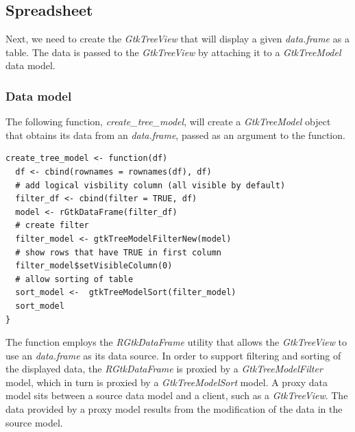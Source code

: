 \documentclass[article]{jss}
\begin{document}
\subsection{Spreadsheet}

Next, we need to create the \emph{GtkTreeView} that will display a
given \emph{data.frame} as a table.  The data is passed to the
\emph{GtkTreeView} by attaching it to a \emph{GtkTreeModel} data
model.

\subsubsection{Data model}\label{sec:spreadsheet-model}

 The following function, \emph{create\_tree\_model}, will create a
\emph{GtkTreeModel} object that obtains its data from an 
\emph{data.frame}, passed as an argument to the function. 
\begin{verbatim}
create_tree_model <- function(df)
  df <- cbind(rownames = rownames(df), df)
  # add logical visbility column (all visible by default)
  filter_df <- cbind(filter = TRUE, df)
  model <- rGtkDataFrame(filter_df)
  # create filter
  filter_model <- gtkTreeModelFilterNew(model)
  # show rows that have TRUE in first column
  filter_model$setVisibleColumn(0)
  # allow sorting of table
  sort_model <-  gtkTreeModelSort(filter_model)
  sort_model
}
\end{verbatim}
The function employs the \emph{RGtkDataFrame} utility that allows
the \emph{GtkTreeView} to use an 
\emph{data.frame} as its data source.
In order to support filtering
and sorting of the displayed data, the \emph{RGtkDataFrame} is proxied
by a \emph{GtkTreeModelFilter} model, which in turn is proxied by a
\emph{GtkTreeModelSort} model. A proxy data model sits between a
source data model and a client, such as a \emph{GtkTreeView}. The data
provided by a proxy model results from the modification of the data in
the source model.
\end{document}
